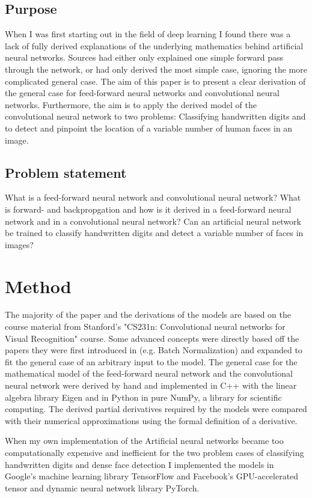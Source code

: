 \documentclass[a4paper,11pt,twoside]{article}
\begin{document}
\subsection{Purpose}
When I was first starting out in the field of deep learning I found there was a lack of fully derived explanations of the underlying mathematics behind artificial neural networks. Sources had either only explained one simple forward pass through the network, or had only derived the most simple case, ignoring the more complicated general case. The aim of this paper is to present a clear derivation of the general case for feed-forward neural networks and convolutional neural networks. Furthermore, the aim is to apply the derived model of the convolutional neural network to two problems: Classifying handwritten digits and to detect and pinpoint the location of a variable number of human faces in an image.

\subsection{Problem statement}
What is a feed-forward neural network and convolutional neural network?
What is forward- and backpropgation and how is it derived in a feed-forward neural network and in a convolutional neural network?
Can an artificial neural network be trained to classify handwritten digits and detect a variable number of faces in images?

\newpage
\section{Method}
The majority of the paper and the derivations of the models are based on the course material from Stanford's "CS231n: Convolutional neural networks for Visual Recognition" course. Some advanced concepts were directly based off the papers they were first introduced in (e.g. Batch Normalization) and expanded to fit the general case of an arbitrary input to the model. The general case for the mathematical model of the feed-forward neural network and the convolutional neural network were derived by hand and implemented in C++ with the linear algebra library Eigen and in Python in pure NumPy, a library for scientific computing. The derived partial derivatives required by the models were compared with their numerical approximations using the formal definition of a derivative. \cite{cs231n} \cite{bn} \cite{eigen} \cite{numpy}

When my own implementation of the Artificial neural networks became too computationally expensive and inefficient for the two problem cases of classifying handwritten digits and dense face detection I implemented the models in Google's machine learning library TensorFlow and Facebook's GPU-accelerated tensor and dynamic neural network library PyTorch. \cite{tensorflow} \cite{pytorch}
\end{document}
